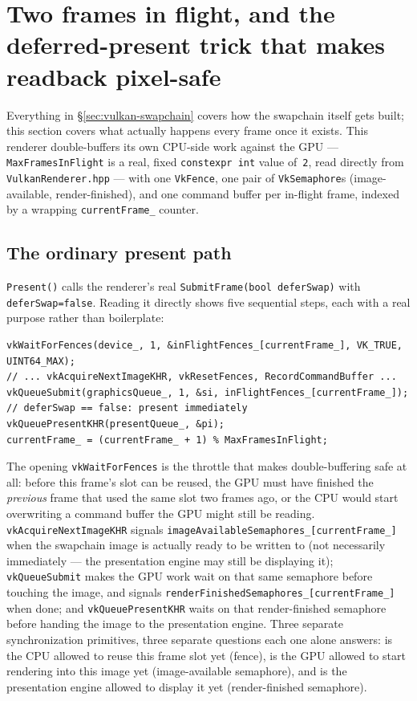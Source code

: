 \section[Two frames in flight, and the deferred-present trick]{Two frames in flight, and
the deferred-present trick that makes readback pixel-safe}
\label{sec:vulkan-frames-in-flight}

Everything in \S\ref{sec:vulkan-swapchain} covers how the swapchain itself gets built; this
section covers what actually happens every frame once it exists. This renderer double-buffers
its own CPU-side work against the GPU --- \texttt{MaxFramesInFlight} is a real, fixed
\texttt{constexpr int} value of~\texttt{2}, read directly from
\texttt{VulkanRenderer.hpp} --- with one \texttt{VkFence}, one pair of
\texttt{VkSemaphore}s (image-available, render-finished), and one command buffer per
in-flight frame, indexed by a wrapping \texttt{currentFrame\_} counter.

\subsection{The ordinary present path}

\texttt{Present()} calls the renderer's real \texttt{SubmitFrame(bool deferSwap)} with
\texttt{deferSwap=false}. Reading it directly shows five sequential steps, each with a real
purpose rather than boilerplate:

\begin{lstlisting}
vkWaitForFences(device_, 1, &inFlightFences_[currentFrame_], VK_TRUE, UINT64_MAX);
// ... vkAcquireNextImageKHR, vkResetFences, RecordCommandBuffer ...
vkQueueSubmit(graphicsQueue_, 1, &si, inFlightFences_[currentFrame_]);
// deferSwap == false: present immediately
vkQueuePresentKHR(presentQueue_, &pi);
currentFrame_ = (currentFrame_ + 1) % MaxFramesInFlight;
\end{lstlisting}

The opening \texttt{vkWaitForFences} is the throttle that makes double-buffering safe at all:
before this frame's slot can be reused, the GPU must have finished the \emph{previous} frame
that used the same slot two frames ago, or the CPU would start overwriting a command buffer
the GPU might still be reading. \texttt{vkAcquireNextImageKHR} signals
\texttt{imageAvailableSemaphores\_[currentFrame\_]} when the swapchain image is actually ready
to be written to (not necessarily immediately --- the presentation engine may still be
displaying it); \texttt{vkQueueSubmit} makes the GPU work wait on that same semaphore before
touching the image, and signals \texttt{renderFinishedSemaphores\_[currentFrame\_]} when done;
and \texttt{vkQueuePresentKHR} waits on that render-finished semaphore before handing the image
to the presentation engine. Three separate synchronization primitives, three separate
questions each one alone answers: is the CPU allowed to reuse this frame slot yet (fence), is
the GPU allowed to start rendering into this image yet (image-available semaphore), and is the
presentation engine allowed to display it yet (render-finished semaphore).


